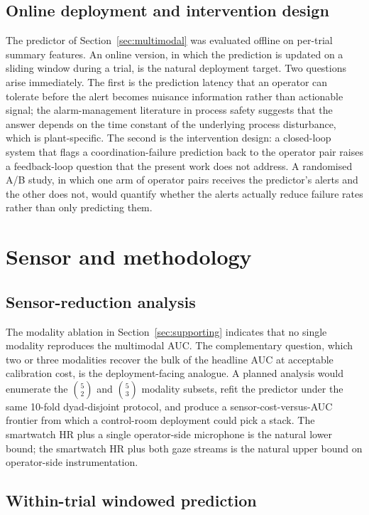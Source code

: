 \subsection{Online deployment and intervention design}

The predictor of Section~\ref{sec:multimodal} was evaluated offline on per-trial summary features. An online version, in which the prediction is updated on a sliding window during a trial, is the natural deployment target. Two questions arise immediately. The first is the prediction latency that an operator can tolerate before the alert becomes nuisance information rather than actionable signal; the alarm-management literature in process safety \cite{bullemer1996abnormal,nimmo1998abnormal} suggests that the answer depends on the time constant of the underlying process disturbance, which is plant-specific. The second is the intervention design: a closed-loop system that flags a coordination-failure prediction back to the operator pair raises a feedback-loop question that the present work does not address. A randomised A/B study, in which one arm of operator pairs receives the predictor's alerts and the other does not, would quantify whether the alerts actually reduce failure rates rather than only predicting them.

\section{Sensor and methodology}

\subsection{Sensor-reduction analysis}

The modality ablation in Section~\ref{sec:supporting} indicates that no single modality reproduces the multimodal AUC. The complementary question, which two or three modalities recover the bulk of the headline AUC at acceptable calibration cost, is the deployment-facing analogue. A planned analysis would enumerate the $\binom{5}{2}$ and $\binom{5}{3}$ modality subsets, refit the predictor under the same 10-fold dyad-disjoint protocol, and produce a sensor-cost-versus-AUC frontier from which a control-room deployment could pick a stack. The smartwatch HR plus a single operator-side microphone is the natural lower bound; the smartwatch HR plus both gaze streams is the natural upper bound on operator-side instrumentation.

\subsection{Within-trial windowed prediction}

